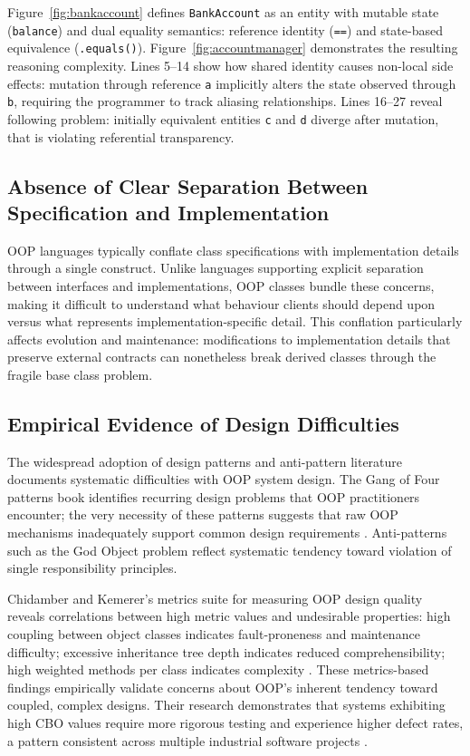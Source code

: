 Figure~\ref{fig:bankaccount} defines \texttt{BankAccount} as an entity with mutable state (\texttt{balance}) and dual equality semantics: reference identity (\texttt{==}) and state-based equivalence (\texttt{.equals()}). Figure~\ref{fig:accountmanager} demonstrates the resulting reasoning complexity. Lines 5--14 show how shared identity causes non-local side effects: mutation through reference \texttt{a} implicitly alters the state observed through \texttt{b}, requiring the programmer to track aliasing relationships. Lines 16--27 reveal following problem: initially equivalent entities \texttt{c} and \texttt{d} diverge after mutation, that is violating referential transparency.

\subsection{Absence of Clear Separation Between Specification and Implementation}

OOP languages typically conflate class specifications with implementation details through a single construct. Unlike languages supporting explicit separation between interfaces and implementations, OOP classes bundle these concerns, making it difficult to understand what behaviour clients should depend upon versus what represents implementation-specific detail. This conflation particularly affects evolution and maintenance: modifications to implementation details that preserve external contracts can nonetheless break derived classes through the fragile base class problem.

\subsection{Empirical Evidence of Design Difficulties}

The widespread adoption of design patterns and anti-pattern literature documents systematic difficulties with OOP system design. The Gang of Four patterns book identifies recurring design problems that OOP practitioners encounter; the very necessity of these patterns suggests that raw OOP mechanisms inadequately support common design requirements \cite{gamma1993design}. Anti-patterns such as the God Object problem reflect systematic tendency toward violation of single responsibility principles.

Chidamber and Kemerer's metrics suite for measuring OOP design quality reveals correlations between high metric values and undesirable properties: high coupling between object classes indicates fault-proneness and maintenance difficulty; excessive inheritance tree depth indicates reduced comprehensibility; high weighted methods per class indicates complexity \cite{chidamber1994metrics}. These metrics-based findings empirically validate concerns about OOP's inherent tendency toward coupled, complex designs. Their research demonstrates that systems exhibiting high CBO values require more rigorous testing and experience higher defect rates, a pattern consistent across multiple industrial software projects \cite{chidamber1994metrics}.

